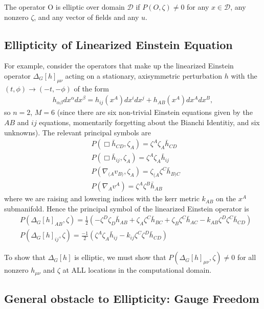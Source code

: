 \documentclass[aps,prd,amsmath,showpacs,amssymb,superscriptaddress,nofootinbib,longbibliography,eqsecnum,preprintnumbers]{revtex4-1}
\begin{document}
The operator O is elliptic over domain $\mathcal{D}$ if $P(O,\zeta)\neq 0$ for any $x\in \mathcal D$, any nonzero $\zeta$, and any vector of fields and any $u$.

\subsection{Ellipticity of Linearized Einstein Equation}
For example, consider the operators that make up the linearized Einstein operator $\Delta_G[h]_{\mu\nu}$ acting on a stationary, axisymmetric perturbation $h$ with the $(t,\phi) \to (-t,-\phi)$
of the form
\begin{align}
h_{\alpha \beta}dx^\alpha dx^\beta=h_{ij}(x^A)dx^{i}dx^j+h_{AB}(x^A)dx^{A}dx^B \label{eq:hform},
\end{align}
so $n=2$, $M =6$ (since there are six non-trivial Einstein equations given by the $AB$ and $ij$ equations, momentarily forgetting about the Bianchi Identitiy, and six unknowns). The relevant principal symbols are
\begin{align}
&P(\Box \bar h_{CD},\zeta_A)=\zeta^A\zeta_A \bar h_{CD} \nonumber \\
&P(\Box \bar h_{ij},\zeta_A)=\zeta^A\zeta_A \bar h_{ij} \nonumber \\
&P(\nabla_{(A}v_{B)},\zeta_A)=\zeta_{(A}\zeta^C \bar h_{B)C} \nonumber \\
&P(\nabla_Av^A)=\zeta^A\zeta^B\bar h_{AB}
\end{align}
where we are raising and lowering indices with the kerr metric $k_{AB}$ on the $x^A$ submanifold. Hence the principal symbol of the linearized Einstein operator is 
\begin{align}
&P(\Delta_G[h]_{AB},\zeta)=\frac{1}{2}\left(-\zeta^D\zeta_D\bar h_{AB}+\zeta_A\zeta^C\bar h_{BC}+\zeta_B\zeta^C\bar h_{AC}-k_{AB}\zeta^D\zeta^C\bar h_{CD}\right) \nonumber \\
& P(\Delta_G[h]_{ij},\zeta)=\frac{-1}{2}\left(\zeta^A\zeta_A \bar h_{ij}-k_{ij}\zeta^C\zeta^D\bar h_{CD}\right) \label{eq:GPrinc}
\end{align}

To show that $\Delta_G[h]$ is elliptic, we must show that $P(\Delta_G[h]_{\mu \nu},\zeta)\neq 0$ for all nonzero $h_{\mu\nu}$ and $\zeta$ at ALL locations in the computational domain.

\subsection{General obstacle to Ellipticity: Gauge Freedom}
\end{document}
